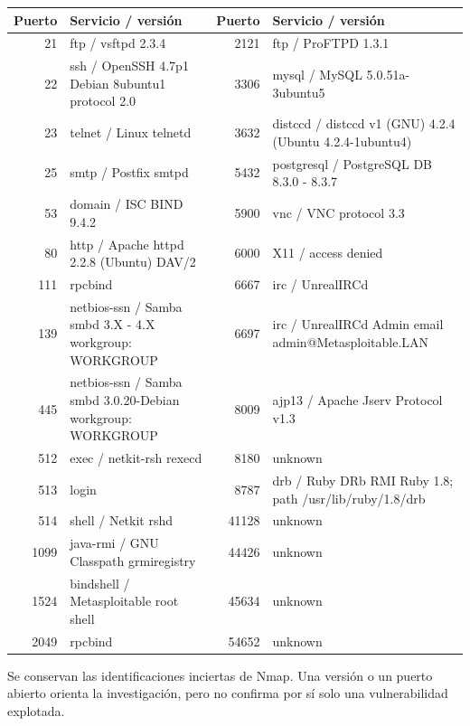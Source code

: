 \documentclass[11pt,a4paper]{article}
\begin{document}
{\fontsize{9}{10.5}\selectfont\setlength{\tabcolsep}{3pt}\par\begin{tabularx}{\linewidth}{rYrY}\toprule
Puerto & Servicio / versión & Puerto & Servicio / versión\\\midrule

21 & ftp / vsftpd 2.3.4 & 2121 & ftp / ProFTPD 1.3.1\\

22 & ssh / OpenSSH 4.7p1 Debian 8ubuntu1 protocol 2.0 & 3306 & mysql / MySQL 5.0.51a-3ubuntu5\\

23 & telnet / Linux telnetd & 3632 & distccd / distccd v1 (GNU) 4.2.4 (Ubuntu 4.2.4-1ubuntu4)\\

25 & smtp / Postfix smtpd & 5432 & postgresql / PostgreSQL DB 8.3.0 - 8.3.7\\

53 & domain / ISC BIND 9.4.2 & 5900 & vnc / VNC  protocol 3.3\\

80 & http / Apache httpd 2.2.8 (Ubuntu) DAV/2 & 6000 & X11 / access denied\\

111 & rpcbind & 6667 & irc / UnrealIRCd\\

139 & netbios-ssn / Samba smbd 3.X - 4.X workgroup: WORKGROUP & 6697 & irc / UnrealIRCd  Admin email admin@Metasploitable.LAN\\

445 & netbios-ssn / Samba smbd 3.0.20-Debian workgroup: WORKGROUP & 8009 & ajp13 / Apache Jserv  Protocol v1.3\\

512 & exec / netkit-rsh rexecd & 8180 & unknown\\

513 & login & 8787 & drb / Ruby DRb RMI  Ruby 1.8; path /usr/lib/ruby/1.8/drb\\

514 & shell / Netkit rshd & 41128 & unknown\\

1099 & java-rmi / GNU Classpath grmiregistry & 44426 & unknown\\

1524 & bindshell / Metasploitable root shell & 45634 & unknown\\

2049 & rpcbind & 54652 & unknown\\

\bottomrule\end{tabularx}}
Se conservan las identificaciones inciertas de Nmap. Una versión o un puerto abierto orienta la investigación, pero no confirma por sí solo una vulnerabilidad explotada.
\end{document}
